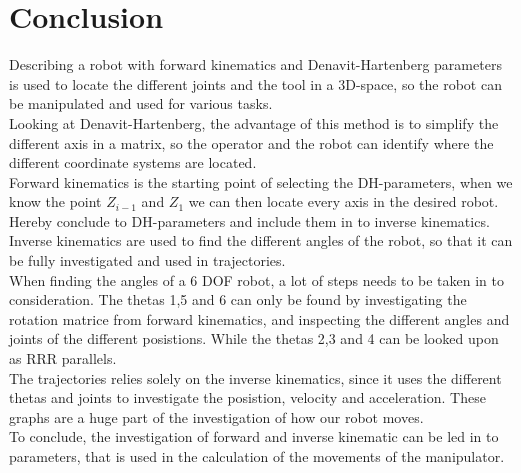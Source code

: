 \section{Conclusion}
Describing a robot with forward kinematics and Denavit-Hartenberg parameters is used to locate the different joints and the tool in a 3D-space, so the robot can be manipulated and used for various tasks.\\
Looking at Denavit-Hartenberg, the advantage of this method is to simplify the different axis in a matrix, so the operator and the robot can identify where the different coordinate systems are located.\\
Forward kinematics is the starting point of selecting the DH-parameters, when we know the point $Z_{i-1}$ and $Z_1$ we can then locate every axis in the desired robot. Hereby conclude to DH-parameters and include them in to inverse kinematics.\\
Inverse kinematics are used to find the different angles of the robot, so that it can be fully investigated and used in trajectories.\\ 
When finding the angles of a 6 DOF robot, a lot of steps needs to be taken in to consideration. The thetas 1,5 and 6 can only be found by investigating the rotation matrice from forward kinematics, and inspecting the different angles and joints of the different posistions. While the thetas 2,3 and 4 can be looked upon as RRR parallels.\\
The trajectories relies solely on the inverse kinematics, since it uses the different thetas and joints to investigate the posistion, velocity and acceleration. These graphs are a huge part of the investigation of how our robot moves.\\
To conclude, the investigation of forward and inverse kinematic can be led in to parameters, that is used in the calculation of the movements of the manipulator.\\






